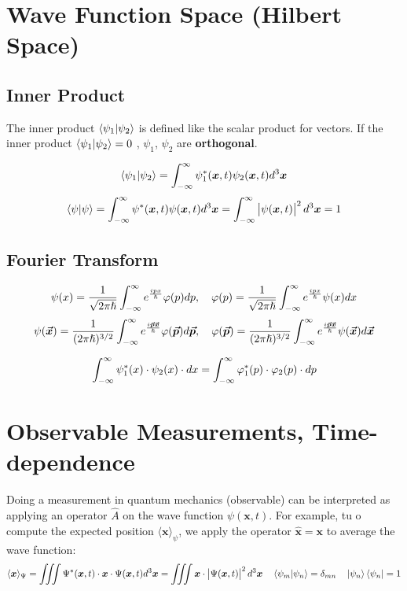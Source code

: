 \documentclass[a4paper, 9pt]{extarticle}
\begin{document}
\section{Wave Function Space (Hilbert Space)}

\subsection{Inner Product}

The inner product $\braket{\psi_1 | \psi_2}$ is defined like the scalar product for vectors. If the inner product $\braket{\psi_1 | \psi_2} = 0$ , $\psi_1$, $\psi_2$ are \textbf{orthogonal}.

$$\braket{\psi_1 | \psi_2} = \int_{-\infty}^{\infty} \psi_1^\ast(\bm{x},t) \psi_2(\bm{x},t) d^3 \bm{x}$$
$$\braket{\psi | \psi} = \int_{-\infty}^{\infty} \psi^\ast(\bm{x},t) \psi(\bm{x},t) d^3 \bm{x} = \int_{-\infty}^{\infty} \left| \psi(\bm{x},t) \right|^2 d^3 \bm{x} = 1$$


\subsection{Fourier Transform}

$$\psi(x) = \frac{1}{\sqrt{2 \pi \hslash}} \int_{-\infty}^{\infty} e^{\frac{i p x}{\hslash}} \varphi(p) dp, \quad \varphi(p) = \frac{1}{\sqrt{2 \pi \hslash}} \int_{-\infty}^{\infty} e^{\frac{i p x}{\hslash}} \psi(x) dx$$
$$\psi(\bm{\vec{x}}) = \frac{1}{(2 \pi \hslash)^{3/2}} \int_{-\infty}^{\infty} e^{\frac{i \bm{\vec{p}} \bm{\vec{x}}}{\hslash}} \varphi(\bm{\vec{p}}) d\bm{\vec{p}}, \quad \varphi(\bm{\vec{p}}) = \frac{1}{(2 \pi \hslash)^{3/2}} \int_{-\infty}^{\infty} e^{\frac{i \bm{\vec{p}} \bm{\vec{x}}}{\hslash}} \psi(\bm{\vec{x}}) d\bm{\vec{x}}$$

$$\int_{-\infty}^{\infty} \psi_1^\ast(x) \cdot \psi_2(x) \cdot dx = \int_{-\infty}^{\infty} \varphi^\ast_1(p) \cdot \varphi_2(p) \cdot dp$$

\section{Observable Measurements, Time-dependence}

Doing a measurement in quantum mechanics (observable) can be interpreted as applying an operator $\hat{A}$ on the wave function $\psi(\bm{x},t)$. For example, tu o compute the expected position $\langle \bm{x} \rangle_\psi$, we apply the operator $\hat{\bm{x}} = \bm{x}$ to average the wave function:
$$\langle \bm{x} \rangle_\Psi = \iiint \Psi^\ast(\bm{x},t) \cdot \bm{x} \cdot \Psi(\bm{x},t) d^3 \bm{x} = \iiint \bm{x} \cdot \left| \Psi(\bm{x},t) \right|^2 d^3\bm{x} \quad \braket{\psi_m|\psi_n} = \delta_{mn} \quad \ket{\psi_n} \bra{\psi_n} = 1$$
\end{document}
